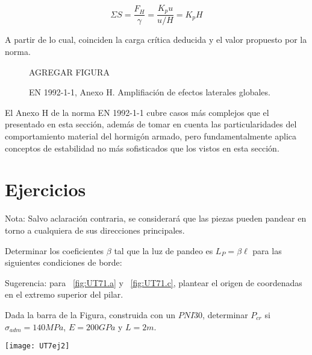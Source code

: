 $$ \Sigma S = \frac{F_H}{\gamma} = \frac{K_p u}{u/H} = K_p H  $$

A partir de lo cual, coinciden la carga crítica deducida y el valor propuesto por la norma. 

\begin{figure}[htb]
	\centering
	AGREGAR FIGURA
	\caption{EN 1992-1-1, Anexo H. Amplifiación de efectos laterales globales.}
\label{fig:EN_Pcrit}
\end{figure}

El Anexo H de la norma EN 1992-1-1 cubre casos más complejos que el presentado en esta sección, además de tomar en cuenta las particularidades del comportamiento material del hormigón armado, pero fundamentalmente aplica conceptos de estabilidad no más sofisticados que los vistos en esta sección.



\section{Ejercicios}
\setcounter{ejercicio}{0}

Nota: Salvo aclaración contraria, se considerará que las piezas pueden pandear en torno a cualquiera de sus direcciones principales.

\ejercicio 

Determinar los coeficientes $\beta$ tal que la luz de pandeo es $L_P=\beta\ell$ para las siguientes condiciones de borde:

\begin{figure}[htb]
	\centering
\subfloat[]{
\texttt{[image: UT7ej1-a]}
	\label{fig:UT71.a}}
\hspace{0.1\textwidth}
\subfloat[]{
\texttt{[image: UT7ej1-b]}
	\label{fig:UT71.b}}
	\hspace{0.1\textwidth}
\subfloat[]{
\texttt{[image: UT7ej1-c]}
	\label{fig:UT71.c}}
\caption{}
	\label{fig:UT71}
\end{figure}

Sugerencia: para ~\ref{fig:UT71.a} y ~\ref{fig:UT71.c}, plantear el origen de coordenadas en el extremo superior del pilar.

\ejercicio 

Dada la barra de la Figura, construida con un $PNI30$, determinar $P_{cr}$ si $\sigma_{adm}=140MPa$, $E=200GPa$ y $L=2m$.

\begin{center}
	\texttt{[image: UT7ej2]}
\end{center}

